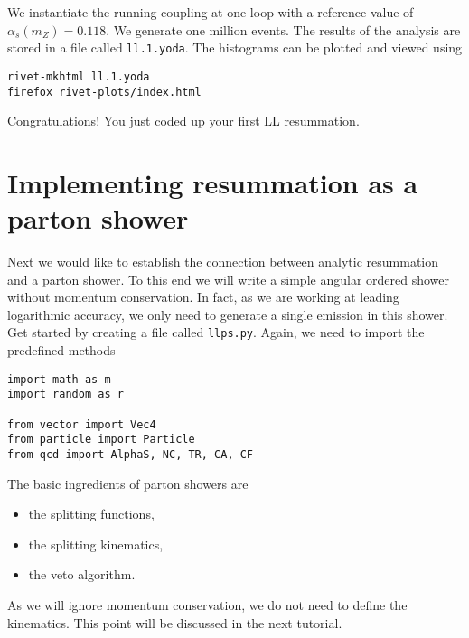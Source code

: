 \documentclass[10pt,fleqn]{scrartcl}
\begin{document}
We instantiate the running coupling at one loop
with a reference value of $\alpha_s(m_Z)=0.118$.
We generate one million events. The results of the analysis
 are stored in a file called {\tt ll.1.yoda}.
The histograms can be plotted and viewed using 
\begin{verbatim}
rivet-mkhtml ll.1.yoda
firefox rivet-plots/index.html
\end{verbatim}
Congratulations! You just coded up your first LL resummation.
\bigskip

\section{Implementing resummation as a parton shower}
Next we would like to establish the connection between analytic resummation
and a parton shower. To this end we will write a simple angular ordered shower
without momentum conservation. In fact, as we are working at leading logarithmic
accuracy, we only need to generate a single emission in this shower.
Get started by creating a file called {\tt llps.py}.
Again, we need to import the predefined methods
\begin{verbatim}
import math as m
import random as r

from vector import Vec4
from particle import Particle
from qcd import AlphaS, NC, TR, CA, CF
\end{verbatim}
The basic ingredients of parton showers are
\begin{itemize}
\item the splitting functions,
\item the splitting kinematics,
\item the veto algorithm.
\end{itemize}
As we will ignore momentum conservation, we do not need to define
the kinematics. This point will be discussed in the next tutorial.
\end{document}
